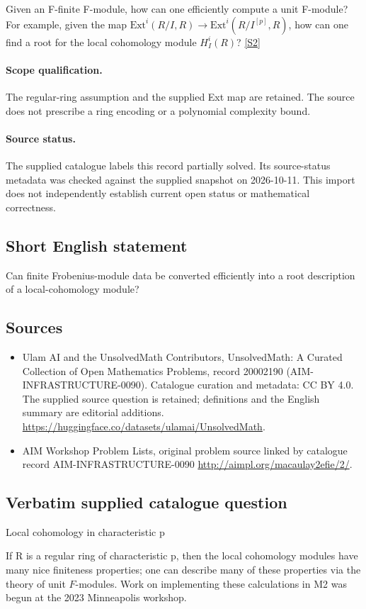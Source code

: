 \documentclass[11pt]{article}
\begin{document}
Given an F-finite F-module, how can one efficiently compute a unit F-module? For example, given the map $\mathrm{Ext}^i(R/I,R)\to \mathrm{Ext}^i(R/I^{[p]},R)$, how can one find a root for the local cohomology module $H^i_I(R)$? \href{http://aimpl.org/macaulay2efie/2/}{[S2]}
\paragraph{Scope qualification.}
The regular-ring assumption and the supplied Ext map are retained. The source does not prescribe a ring encoding or a polynomial complexity bound.
\paragraph{Source status.}
The supplied catalogue labels this record partially solved. Its source-status metadata was checked against the supplied snapshot on 2026-10-11. This import does not independently establish current open status or mathematical correctness.
\subsection{Short English statement}
Can finite Frobenius-module data be converted efficiently into a root description of a local-cohomology module?
\subsection{Sources}
\begin{itemize}
\item[S1] Ulam AI and the UnsolvedMath Contributors, UnsolvedMath: A Curated Collection of Open Mathematics Problems, record 20002190 (AIM-INFRASTRUCTURE-0090). Catalogue curation and metadata: CC BY 4.0. The supplied source question is retained; definitions and the English summary are editorial additions.
\url{https://huggingface.co/datasets/ulamai/UnsolvedMath}.
\item[S2] AIM Workshop Problem Lists, original problem source linked by catalogue record AIM-INFRASTRUCTURE-0090
\url{http://aimpl.org/macaulay2efie/2/}.
\end{itemize}
\subsection{Verbatim supplied catalogue question}
Local cohomology in characteristic p

If R is a regular ring of characteristic p, then the local cohomology modules have many nice finiteness properties; one can describe many of these properties via the theory of unit $F$-modules. Work on implementing these calculations in M2 was begun at the 2023 Minneapolis workshop.
\end{document}

